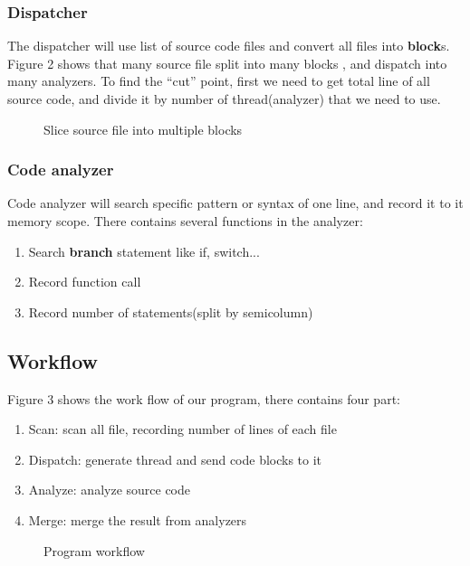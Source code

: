 \documentclass{acm_proc_article-sp}
\begin{document}
\subsubsection{Dispatcher}
	The dispatcher will use list of source code files and convert all files into
	\textbf{block}s. Figure 2 shows that many source file split into many blocks
	, and dispatch into many analyzers. To find the ``cut'' point, first we need to 
	get total line of all source code, and divide it by number of thread(analyzer)
	that we need to use.
\begin{figure}
	\centering
	\caption{Slice source file into multiple blocks}
\end{figure}
\subsubsection{Code analyzer}
	Code analyzer will search specific pattern or syntax of one line, and record 
	it to it memory scope. There contains several functions in the analyzer:
	\begin{enumerate}
		\item Search \textbf{branch} statement like if, switch...
		\item Record function call
		\item Record number of statements(split by semicolumn)
	\end{enumerate}
	
\subsection{Workflow}
	Figure 3 shows the work flow of our program, there contains four part:
	\begin{enumerate}
		\item Scan: scan all file, recording number of lines of each file
		\item Dispatch: generate thread and send code blocks to it
		\item Analyze: analyze source code
		\item Merge: merge the result from analyzers
	\end{enumerate}

\begin{figure}
	\centering
	\caption{Program workflow}
\end{figure}
\end{document}
